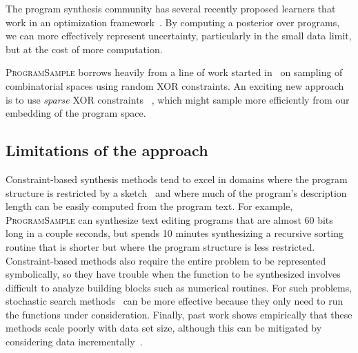 \documentclass{article}
\newcommand{\theSystem}{\textsc{ProgramSample}}
\begin{document}
The program synthesis community has several recently proposed learners that work in an optimization framework~\cite{raychev2016learning,ellis2015unsupervised,singh2013automated}. %
  By computing a posterior over programs, we can more effectively represent uncertainty, particularly in the small data limit, but at the cost of more computation.

\theSystem{} borrows heavily from a line of work started
in~\cite{gomes2006near,gomes2006model} on sampling of combinatorial
spaces using random XOR constraints. An exciting new approach
is to use \emph{sparse} XOR constraints~\cite{ermon2014low,achlioptas2015stochastic} %
, which might  sample more efficiently from our embedding of the program
space.

\subsection{Limitations of the approach}

Constraint-based synthesis methods tend to excel in domains where the program structure is restricted by a sketch~\cite{solar2008program} and where much of the program's description length can be easily computed from the program text. 
For example, \theSystem{} can synthesize text editing programs that are almost 60 bits long in a couple seconds, but spends 10 minutes synthesizing a recursive sorting routine that is shorter but where the program structure is less restricted. 
Constraint-based methods also require the entire problem to be represented symbolically, so they have trouble when the function to be synthesized involves difficult to analyze building blocks such as numerical routines.
For such problems, stochastic search methods~\cite{schkufza2013stochastic,DBLP:books/daglib/0070933} can be more effective because they only need to run the functions under consideration. Finally, past work shows empirically that these methods scale poorly with data set size, although this can be mitigated by considering data incrementally~\cite{ellis2015unsupervised,raychev2016learning}.
\end{document}
